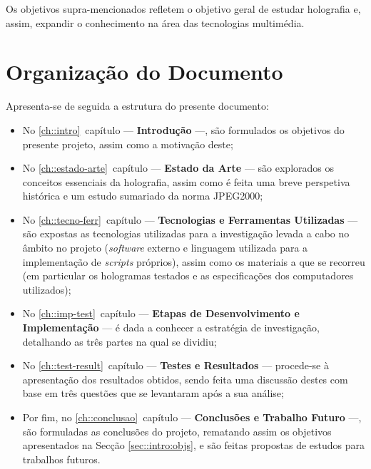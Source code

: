 Os objetivos supra-mencionados refletem o objetivo geral de estudar holografia e, assim, expandir o conhecimento na área das tecnologias multimédia.


\section{Organização do Documento}
\label{sec::intro:organiza}

Apresenta-se de seguida a estrutura do presente documento:

\begin{itemize}
  \item No \ref{ch::intro}\textordmasculine~capítulo --- \textbf{Introdução} ---, são formulados os objetivos do presente projeto, assim como a motivação deste;

  \item No \ref{ch::estado-arte}\textordmasculine~capítulo --- \textbf{Estado da Arte} --- são explorados os conceitos essenciais da holografia, assim como é feita uma breve perspetiva histórica e um estudo sumariado da norma JPEG2000;

  \item No \ref{ch::tecno-ferr}\textordmasculine~capítulo --- \textbf{Tecnologias e Ferramentas Utilizadas} --- são expostas as tecnologias utilizadas para a investigação levada a cabo no âmbito no projeto (\textit{software} externo e linguagem utilizada para a implementação de \textit{scripts} próprios), assim como os materiais a que se recorreu (em particular os hologramas testados e as especificações dos computadores utilizados);

  \item No \ref{ch::imp-test}\textordmasculine~capítulo --- \textbf{Etapas de Desenvolvimento e Implementação} --- é dada a conhecer a estratégia de investigação, detalhando as três partes na qual se dividiu;%

  \item No \ref{ch::test-result}\textordmasculine~capítulo --- \textbf{Testes e Resultados} --- procede-se à apresentação dos resultados obtidos, sendo feita uma discussão destes com base em três questões que se levantaram após a sua análise;

  \item Por fim, no \ref{ch::conclusao}\textordmasculine~capítulo --- \textbf{Conclusões e Trabalho Futuro} ---, são formuladas as conclusões do projeto, rematando assim os objetivos apresentados na Secção \ref{sec::intro:objs}, e são feitas propostas de estudos para trabalhos futuros.
\end{itemize}

